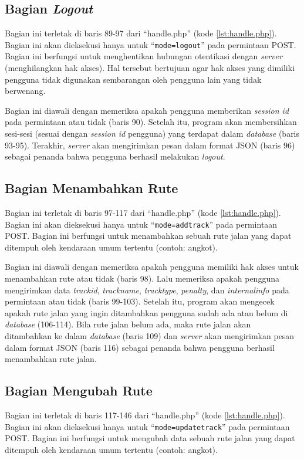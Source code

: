\subsection{Bagian \textit{Logout}}
\label{sec:bagianlogout}
Bagian ini terletak di baris 89-97 dari ``handle.php'' (kode \ref{lst:handle.php}). Bagian ini akan dieksekusi hanya untuk ``\texttt{mode=logout}'' pada permintaan POST. Bagian ini berfungsi untuk menghentikan hubungan otentikasi dengan \textit{server} (menghilangkan hak akses). Hal tersebut bertujuan agar hak akses yang dimiliki pengguna tidak digunakan sembarangan oleh pengguna lain yang tidak berwenang.

Bagian ini diawali dengan memeriksa apakah pengguna memberikan \textit{session id} pada permintaan atau tidak (baris 90). Setelah itu, program akan membersihkan sesi-sesi (sesuai dengan \textit{session id} pengguna) yang terdapat dalam \textit{database} (baris 93-95). Terakhir, \textit{server} akan mengirimkan pesan dalam format JSON (baris 96) sebagai penanda bahwa pengguna berhasil melakukan \textit{logout}.

\subsection{Bagian Menambahkan Rute}
\label{sec:menambahkanrute}
Bagian ini terletak di baris 97-117 dari ``handle.php'' (kode \ref{lst:handle.php}). Bagian ini akan dieksekusi hanya untuk ``\texttt{mode=addtrack}'' pada permintaan POST. Bagian ini berfungsi untuk menambahkan sebuah rute jalan yang dapat ditempuh oleh kendaraan umum tertentu (contoh: angkot).

Bagian ini diawali dengan memeriksa apakah pengguna memiliki hak akses untuk menambahkan rute atau tidak (baris 98). Lalu memeriksa apakah pengguna mengirimkan data \textit{trackid}, \textit{trackname}, \textit{tracktype}, \textit{penalty}, dan \textit{internalinfo} pada permintaan atau tidak (baris 99-103). Setelah itu, program akan mengecek apakah rute jalan yang ingin ditambahkan pengguna sudah ada atau belum di \textit{database} (106-114). Bila rute jalan belum ada, maka rute jalan akan ditambahkan ke dalam \textit{database} (baris 109) dan \textit{server} akan mengirimkan pesan dalam format JSON (baris 116) sebagai penanda bahwa pengguna berhasil menambahkan rute jalan.

\subsection{Bagian Mengubah Rute}
\label{sec:mengubahrute}
Bagian ini terletak di baris 117-146 dari ``handle.php'' (kode \ref{lst:handle.php}). Bagian ini akan dieksekusi hanya untuk ``\texttt{mode=updatetrack}'' pada permintaan POST. Bagian ini berfungsi untuk mengubah data sebuah rute jalan yang dapat ditempuh oleh kendaraan umum tertentu (contoh: angkot).

